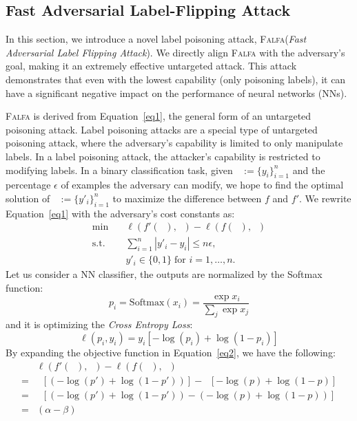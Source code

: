 \documentclass[runningheads]{llncs}
\newcommand{\falfa}{\textsc{Falfa}\xspace}
\DeclareMathOperator*{\Xtr}{\mathcal{X}_\text{train}}
\DeclareMathOperator*{\ytr}{\mathcal{Y}_\text{train}}
\DeclareMathOperator*{\ypo}{\mathcal{Y}^\prime_\text{train}}
\begin{document}
\subsection{Fast Adversarial Label-Flipping Attack}
\label{sec:method:falfa}

In this section, we introduce a novel label poisoning attack, \falfa (\emph{Fast Adversarial Label Flipping Attack}).
We directly align \falfa with the adversary's goal, making it an extremely effective untargeted attack.
This attack demonstrates that even with the lowest capability (only poisoning labels), it can have a significant negative impact on the performance of neural networks (NNs).

\falfa is derived from Equation~\ref{eq1}, the general form of an untargeted poisoning attack.
Label poisoning attacks are a special type of untargeted poisoning attack, where the adversary's capability is limited to only manipulate labels.
In a label poisoning attack, the attacker's capability is restricted to modifying labels.
In a binary classification task, given $\ytr:=\{y_i\}^n_{i=1}$ and the percentage $\epsilon$ of examples  the adversary can modify,
we hope to find the optimal solution of $\ypo:=\{y'_i\}^n_{i=1}$ to maximize the difference between $f$ and $f'$.
We rewrite Equation~\ref{eq1} with the adversary's cost constants as:
\begin{equation}
    \begin{aligned}
        \min_{\ypo} \quad   & \ell(f'(\Xtr), \ypo) - \ell(f(\Xtr), \ypo)           \\
        \textrm{s.t.} \quad & \sum_{i=1}^{n} |y'_i - y_i| \leq n \epsilon,         \\
        \quad               & y'_i \in \{0, 1\}  \; \text{for } i = 1,  \ldots, n.
    \end{aligned}
    \label{eq2}
\end{equation}
Let us consider a NN classifier, the outputs are normalized by the Softmax function:
\begin{equation}
    p_i = \text{Softmax}(x_i) = \frac{\exp{x_i}}{\sum_j\exp{x_j}}
\end{equation}
and it is optimizing the \emph{Cross Entropy Loss}:
\begin{equation}
    \ell(p_i, y_i) = y_i[-\log(p_i) + \log(1-p_i)]
\end{equation}
By expanding the objective function in Equation~\ref{eq2}, we have the following:
\begin{equation*}
    \begin{aligned}
          & \ell(f'(\Xtr), \ypo) - \ell(f(\Xtr), \ypo)                  \\
        = & \ypo[(-\log(p') + \log(1-p'))] - \ypo[-\log(p) + \log(1-p)] \\
        = & \ypo[(-\log(p') + \log(1-p')) - (-\log(p) + \log(1-p))]     \\
        = & (\alpha - \beta)\ypo
    \end{aligned}
    \label{eq3}
\end{equation*}
\end{document}

